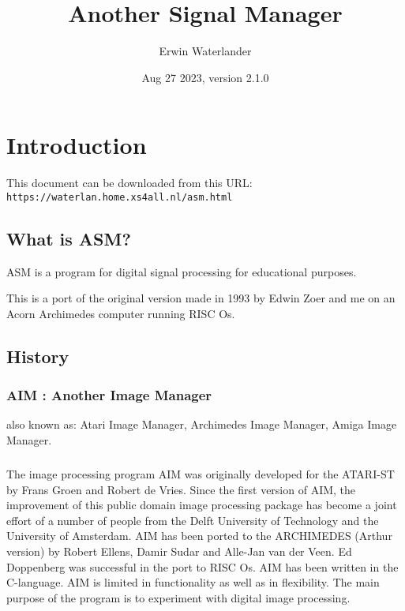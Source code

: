 \documentclass{report}
\title{Another Signal Manager}
\author{Erwin Waterlander}
\date{Aug 27 2023, version 2.1.0}          %
\begin{document}

\maketitle                   %

\tableofcontents

\chapter{Introduction}\label{chap:intro}

This document can be downloaded from this URL:\\
\texttt{https://waterlan.home.xs4all.nl/asm.html}


\section{What is ASM?}


ASM is a program for digital signal processing for educational
purposes.

This is a port of the original version made in 1993 by Edwin Zoer and me on an
Acorn Archimedes computer running RISC Os.

\section{History}

\subsection{AIM : Another Image Manager}

also known as:
Atari Image Manager,
Archimedes Image Manager,
Amiga Image Manager. 

\paragraph{}
The image processing program AIM was originally developed for the 
ATARI-ST  by Frans Groen and  Robert de Vries.  Since  the  first 
version  of  AIM, the improvement of  this  public  domain  image 
processing  package  has  become a joint effort of  a  number  of 
people from the Delft University of Technology and the University 
of  Amsterdam.
AIM has been ported to the ARCHIMEDES (Arthur version) by  Robert
Ellens, Damir Sudar and Alle-Jan van der Veen.
Ed Doppenberg  was successful in the port to RISC Os. 
AIM has been written in the C-language. 
AIM is limited in functionality as well as in flexibility.
The main  purpose of the program is to experiment with digital
image processing.
\end{document}
